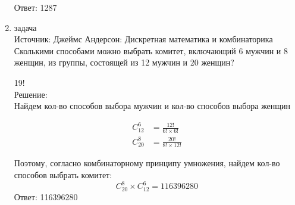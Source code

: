 \documentclass[a4paper,14pt]{extreport} %
\begin{document}
\begin{center}
\begin{enumerate}
						 Ответ: 1287
						 
						  \item {\large задача  }\\
						 Источник: Джеймс Андерсон: Дискретная математика и комбинаторика\\
						 \vspace{15pt}
						 Сколькими способами можно выбрать комитет, включающий 6
						 мужчин и 8 женщин, из группы, состоящей из 12 мужчин и 20 женщин?
						 
						 19!\\
						 \vspace{15pt}
						 Решение:\\
						 Найдем кол-во способов выбора мужчин и кол-во способов выбора женщин
						 
						 \begin{align}
						 	C_{12}^6 &= \frac{12!}{6!\times6!}\\
						 	C_{20}^8 &= \frac{20!}{8!\times12!}  
						 \end{align}
						 
						
						 
					
						 Поэтому, согласно комбинаторному принципу умножения, найдем кол-во способов выбрать комитет:
						 \begin{equation}
						 	C_{20}^8 \times C_{12}^6 = 116396280
						 \end{equation}
						 Ответ: 116396280
				\end{enumerate}
			\end{center}
			



	
	
\end{document}
